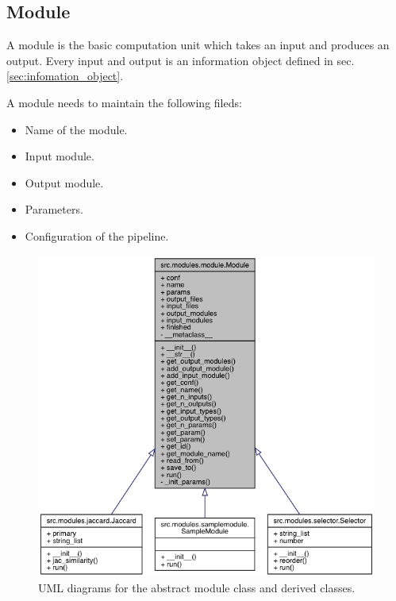\documentclass{article}
\begin{document}
    \subsection{Module}
    A module is the basic computation unit which takes an input and produces an output.
    Every input and output is an information object defined in sec. \ref{sec:infomation_object}.

    A module needs to maintain the following fileds:
    \begin{itemize}
        \item Name of the module.
        \item Input module.
        \item Output module.
        \item Parameters.
        \item Configuration of the pipeline.
    \end{itemize}

    \begin{figure}[H]
        \begin{center}
            \includegraphics[width=\textwidth]{fig/module_uml.png}
        \end{center}
        \label{fig:module_uml}
        \caption{UML diagrams for the abstract module class and derived classes.}
    \end{figure}
\end{document}
